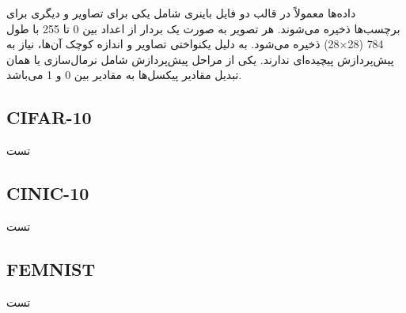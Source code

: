 داده‌ها معمولاً در قالب دو فایل باینری شامل یکی برای تصاویر و دیگری برای برچسب‌ها ذخیره می‌شوند. هر تصویر به صورت یک بردار از اعداد بین 0 تا 255 با طول 784
(28$\times$28)
ذخیره می‌شود. به دلیل یکنواختی تصاویر و اندازه کوچک آن‌ها، نیاز به پیش‌پردازش پیچیده‌ای ندارند. یکی از مراحل پیش‌پردازش شامل نرمال‌سازی یا همان تبدیل مقادیر پیکسل‌ها به مقادیر بین 0 و 1 می‌باشد.
%
%
%
%



\subsection{CIFAR-10}
تست

\subsection{CINIC-10}
تست

\subsection{FEMNIST}
تست


